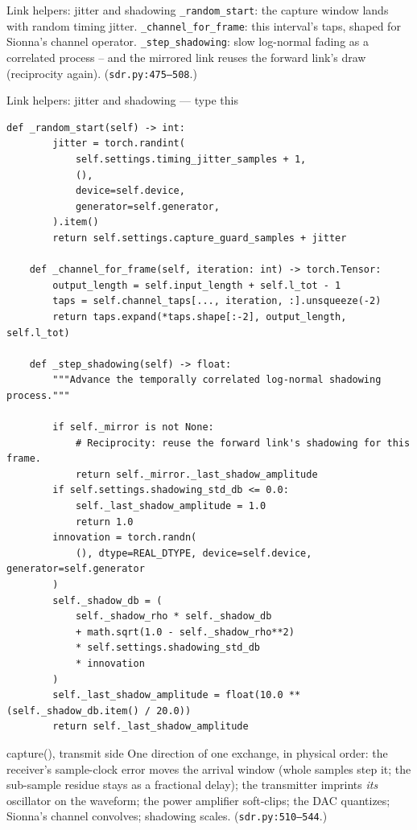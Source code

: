 \documentclass[10pt]{beamer}
\begin{document}
\begin{frame}{Link helpers: jitter and shadowing}
  \texttt{\_random\_start}: the capture window lands with
  random timing jitter. \texttt{\_channel\_for\_frame}: this
  interval's taps, shaped for Sionna's channel operator.
  \texttt{\_step\_shadowing}: slow log-normal fading as a
  correlated process -- and the mirrored link reuses the
  forward link's draw (reciprocity again).
  (\texttt{sdr.py:475--508}.)
\end{frame}

\begin{frame}[fragile]{Link helpers: jitter and shadowing --- type this}
\begin{lstlisting}[basicstyle=\ttfamily\tiny]
    def _random_start(self) -> int:
        jitter = torch.randint(
            self.settings.timing_jitter_samples + 1,
            (),
            device=self.device,
            generator=self.generator,
        ).item()
        return self.settings.capture_guard_samples + jitter

    def _channel_for_frame(self, iteration: int) -> torch.Tensor:
        output_length = self.input_length + self.l_tot - 1
        taps = self.channel_taps[..., iteration, :].unsqueeze(-2)
        return taps.expand(*taps.shape[:-2], output_length, self.l_tot)

    def _step_shadowing(self) -> float:
        """Advance the temporally correlated log-normal shadowing process."""

        if self._mirror is not None:
            # Reciprocity: reuse the forward link's shadowing for this frame.
            return self._mirror._last_shadow_amplitude
        if self.settings.shadowing_std_db <= 0.0:
            self._last_shadow_amplitude = 1.0
            return 1.0
        innovation = torch.randn(
            (), dtype=REAL_DTYPE, device=self.device, generator=self.generator
        )
        self._shadow_db = (
            self._shadow_rho * self._shadow_db
            + math.sqrt(1.0 - self._shadow_rho**2)
            * self.settings.shadowing_std_db
            * innovation
        )
        self._last_shadow_amplitude = float(10.0 ** (self._shadow_db.item() / 20.0))
        return self._last_shadow_amplitude
\end{lstlisting}
\end{frame}

\begin{frame}{capture(), transmit side}
  One direction of one exchange, in physical order: the
  receiver's sample-clock error moves the arrival window
  (whole samples step it; the sub-sample residue stays as a
  fractional delay); the transmitter imprints \emph{its}
  oscillator on the waveform; the power amplifier soft-clips;
  the DAC quantizes; Sionna's channel convolves; shadowing
  scales. (\texttt{sdr.py:510--544}.)
\end{frame}
\end{document}
